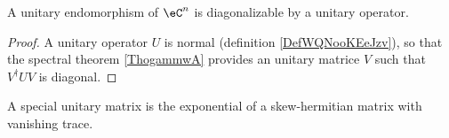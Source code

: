 \begin{proposition}     \label{PROPooYXPRooBgikdE}
    A unitary endomorphism of \( \eC^n\) is diagonalizable by a unitary operator.
\end{proposition}

\begin{proof}
    A unitary operator \( U\) is normal (definition \ref{DefWQNooKEeJzv}), so that the spectral theorem \ref{ThogammwA} provides an unitary matrice \( V\) such that \( V^{\dag}UV\) is diagonal.
\end{proof}

\begin{proposition}     \label{PROPooZBJSooEIguXR}
    A special unitary matrix is the exponential of a skew-hermitian matrix with vanishing trace. 
\end{proposition}

